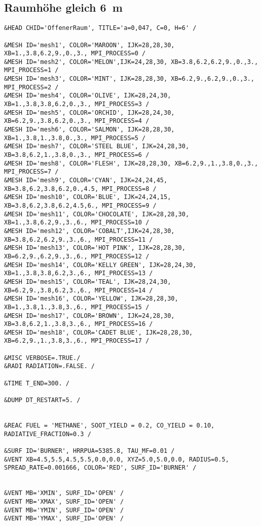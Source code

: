 \subsection*{Raumhöhe gleich 6~m}
\begin{lstlisting}[emptylines=0,basicstyle=\tiny]
&HEAD CHID='OffenerRaum', TITLE='a=0,047, C=0, H=6' /

&MESH ID='mesh1', COLOR='MAROON', IJK=28,28,30, XB=1.,3.8,6.2,9.,0.,3., MPI_PROCESS=0 /
&MESH ID='mesh2', COLOR='MELON',IJK=24,28,30, XB=3.8,6.2,6.2,9.,0.,3., MPI_PROCESS=1 /
&MESH ID='mesh3', COLOR='MINT', IJK=28,28,30, XB=6.2,9.,6.2,9.,0.,3., MPI_PROCESS=2 /
&MESH ID='mesh4', COLOR='OLIVE', IJK=28,24,30, XB=1.,3.8,3.8,6.2,0.,3., MPI_PROCESS=3 /
&MESH ID='mesh5', COLOR='ORCHID', IJK=28,24,30, XB=6.2,9.,3.8,6.2,0.,3., MPI_PROCESS=4 /
&MESH ID='mesh6', COLOR='SALMON', IJK=28,28,30, XB=1.,3.8,1.,3.8,0.,3., MPI_PROCESS=5 /
&MESH ID='mesh7', COLOR='STEEL BLUE', IJK=24,28,30, XB=3.8,6.2,1.,3.8,0.,3., MPI_PROCESS=6 /
&MESH ID='mesh8', COLOR='FLESH', IJK=28,28,30, XB=6.2,9.,1.,3.8,0.,3., MPI_PROCESS=7 /
&MESH ID='mesh9', COLOR='CYAN', IJK=24,24,45, XB=3.8,6.2,3.8,6.2,0.,4.5, MPI_PROCESS=8 /
&MESH ID='mesh10', COLOR='BLUE', IJK=24,24,15, XB=3.8,6.2,3.8,6.2,4.5,6., MPI_PROCESS=9 /
&MESH ID='mesh11', COLOR='CHOCOLATE', IJK=28,28,30, XB=1.,3.8,6.2,9.,3.,6., MPI_PROCESS=10 /
&MESH ID='mesh12', COLOR='COBALT',IJK=24,28,30, XB=3.8,6.2,6.2,9.,3.,6., MPI_PROCESS=11 /
&MESH ID='mesh13', COLOR='HOT PINK', IJK=28,28,30, XB=6.2,9.,6.2,9.,3.,6., MPI_PROCESS=12 /
&MESH ID='mesh14', COLOR='KELLY GREEN', IJK=28,24,30, XB=1.,3.8,3.8,6.2,3.,6., MPI_PROCESS=13 /
&MESH ID='mesh15', COLOR='TEAL', IJK=28,24,30, XB=6.2,9.,3.8,6.2,3.,6., MPI_PROCESS=14 /
&MESH ID='mesh16', COLOR='YELLOW', IJK=28,28,30, XB=1.,3.8,1.,3.8,3.,6., MPI_PROCESS=15 /
&MESH ID='mesh17', COLOR='BROWN', IJK=24,28,30, XB=3.8,6.2,1.,3.8,3.,6., MPI_PROCESS=16 /
&MESH ID='mesh18', COLOR='CADET BLUE', IJK=28,28,30, XB=6.2,9.,1.,3.8,3.,6., MPI_PROCESS=17 /

&MISC VERBOSE=.TRUE./
&RADI RADIATION=.FALSE. /

&TIME T_END=300. /

&DUMP DT_RESTART=5. /


&REAC FUEL = 'METHANE', SOOT_YIELD = 0.2, CO_YIELD = 0.10, RADIATIVE_FRACTION=0.3 /

&SURF ID='BURNER', HRRPUA=5385.8, TAU_MF=0.01 /
&VENT XB=4.5,5.5,4.5,5.5,0.0,0.0, XYZ=5.0,5.0,0.0, RADIUS=0.5, SPREAD_RATE=0.001666, COLOR='RED', SURF_ID='BURNER' /


&VENT MB='XMIN', SURF_ID='OPEN' /  
&VENT MB='XMAX', SURF_ID='OPEN' /  
&VENT MB='YMIN', SURF_ID='OPEN' /  
&VENT MB='YMAX', SURF_ID='OPEN' / 


\end{lstlisting}
